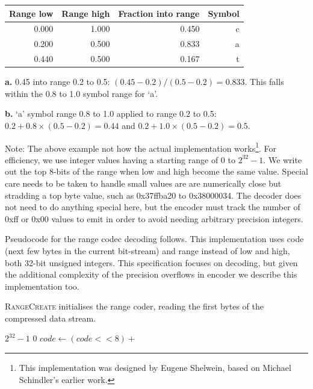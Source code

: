\documentclass[a4paper]{article}
\begin{document}
\begin{threeparttable}[t]
\begin{tabular}{rrrr}
\hline
\textbf{Range low} & \textbf{Range high} & \textbf{Fraction into range} & \textbf{Symbol}\\
\hline
0.000 & 1.000 & 0.450 & c\\
0.200 & 0.500 & 0.833\tnote{\textbf{a}} & a\\
0.440\tnote{\textbf{b}} & 0.500 & 0.167 & t\\
\hline
\end{tabular}
\begin{tablenotes}
\item{\textbf{a.}} 0.45 into range 0.2 to 0.5: $(0.45-0.2)/(0.5-0.2) = 0.833$.
This falls within the 0.8 to 1.0 symbol range for `a'.
\item{\textbf{b.}} `a' symbol range 0.8 to 1.0 applied to range 0.2 to 0.5:  $0.2+0.8\times(0.5-0.2) = 0.44$ and $0.2+1.0\times(0.5-0.2) = 0.5$.
\end{tablenotes}
\end{threeparttable}

Note: The above example not how the actual implementation works\footnote{This implementation was designed by Eugene Shelwein, based on Michael Schindler's earlier work.}.
For efficiency, we use integer values having a starting range of 0 to $2^{32}-1$.
We write out the top 8-bits of the range when low and high become the same value.
Special care needs to be taken to handle small values are are numerically close but stradding a top byte value, such as 0x37ffba20 to 0x38000034.
The decoder does not need to do anything special here, but the encoder must track the number of 0xff or 0x00 values to emit in order to avoid needing arbitrary precision integers.

Pseudocode for the range codec decoding follows.
This implementation uses code (next few bytes in the current bit-stream) and range instead of low and high, both 32-bit unsigned integers.
This specification focuses on decoding, but given the additional complexity of the precision overflows in encoder we describe this implementation too.

\textsc{RangeCreate} initialises the range coder, reading the first bytes of the compressed data stream.

\begin{algorithmic}[1]
  \settowidth{\maxwidth}{range\ }
  \State {} $2^{32}-1$
  \State {} $0$
    \State $code \gets (code << 8) + $
  \EndFor
\EndProcedure
\end{algorithmic}
\end{document}

